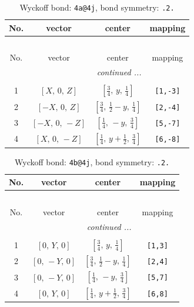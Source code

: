 \documentclass[fleqn,8pt]{jsarticle}
\begin{document}
\begin{longtable}{cccc}
\caption{Wyckoff bond: {\tt 4a@4j}, bond symmetry: {\tt .2.}}
 \\
 \hline \hline
No. & vector & center & mapping \\ \hline \endfirsthead

\multicolumn{3}{l}{\tablename\ \thetable{}} \\
 \hline \hline
No. & vector & center & mapping \\ \hline \endhead

 \hline \hline
\multicolumn{3}{r}{\footnotesize\it continued ...} \\ \endfoot

 \hline \hline
\multicolumn{3}{r}{} \\ \endlastfoot

1 & $\left[ X,\, 0,\, Z \right]$ & $\left[ \frac{3}{4},\, y,\, \frac{1}{4} \right]$ & {\tt [1,-3]} \\ \hline
2 & $\left[ - X,\, 0,\, Z \right]$ & $\left[ \frac{3}{4},\, \frac{1}{2} - y,\, \frac{1}{4} \right]$ & {\tt [2,-4]} \\ \hline
3 & $\left[ - X,\, 0,\, - Z \right]$ & $\left[ \frac{1}{4},\, - y,\, \frac{3}{4} \right]$ & {\tt [5,-7]} \\ \hline
4 & $\left[ X,\, 0,\, - Z \right]$ & $\left[ \frac{1}{4},\, y + \frac{1}{2},\, \frac{3}{4} \right]$ & {\tt [6,-8]} \\
\end{longtable}
\renewcommand{\arraystretch}{1.2}
\begin{longtable}{cccc}
\caption{Wyckoff bond: {\tt 4b@4j}, bond symmetry: {\tt .2.}}
 \\
 \hline \hline
No. & vector & center & mapping \\ \hline \endfirsthead

\multicolumn{3}{l}{\tablename\ \thetable{}} \\
 \hline \hline
No. & vector & center & mapping \\ \hline \endhead

 \hline \hline
\multicolumn{3}{r}{\footnotesize\it continued ...} \\ \endfoot

 \hline \hline
\multicolumn{3}{r}{} \\ \endlastfoot

1 & $\left[ 0,\, Y,\, 0 \right]$ & $\left[ \frac{3}{4},\, y,\, \frac{1}{4} \right]$ & {\tt [1,3]} \\ \hline
2 & $\left[ 0,\, - Y,\, 0 \right]$ & $\left[ \frac{3}{4},\, \frac{1}{2} - y,\, \frac{1}{4} \right]$ & {\tt [2,4]} \\ \hline
3 & $\left[ 0,\, - Y,\, 0 \right]$ & $\left[ \frac{1}{4},\, - y,\, \frac{3}{4} \right]$ & {\tt [5,7]} \\ \hline
4 & $\left[ 0,\, Y,\, 0 \right]$ & $\left[ \frac{1}{4},\, y + \frac{1}{2},\, \frac{3}{4} \right]$ & {\tt [6,8]} \\
\end{longtable}
\end{document}
